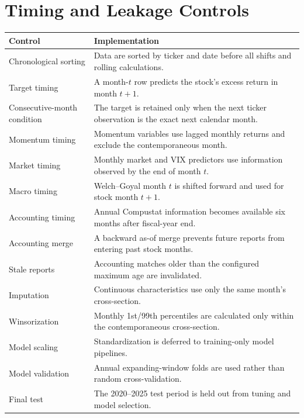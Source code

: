 \documentclass[11pt,a4paper]{article}
\begin{document}

\section{Timing and Leakage Controls}

\begin{center}
\small
\begin{tabularx}{\textwidth}{p{4.0cm}Y}
\toprule
Control & Implementation \\
\midrule

Chronological sorting
&
Data are sorted by ticker and date before all shifts and rolling calculations.
\\

Target timing
&
A month-\(t\) row predicts the stock's excess return in month \(t+1\).
\\

Consecutive-month condition
&
The target is retained only when the next ticker observation is the exact next
calendar month.
\\

Momentum timing
&
Momentum variables use lagged monthly returns and exclude the contemporaneous
month.
\\

Market timing
&
Monthly market and VIX predictors use information observed by the end of month
\(t\).
\\

Macro timing
&
Welch--Goyal month \(t\) is shifted forward and used for stock month \(t+1\).
\\

Accounting timing
&
Annual Compustat information becomes available six months after fiscal-year
end.
\\

Accounting merge
&
A backward as-of merge prevents future reports from entering past stock months.
\\

Stale reports
&
Accounting matches older than the configured maximum age are invalidated.
\\

Imputation
&
Continuous characteristics use only the same month's cross-section.
\\

Winsorization
&
Monthly 1st/99th percentiles are calculated only within the contemporaneous
cross-section.
\\

Model scaling
&
Standardization is deferred to training-only model pipelines.
\\

Model validation
&
Annual expanding-window folds are used rather than random cross-validation.
\\

Final test
&
The 2020--2025 test period is held out from tuning and model selection.
\\

\bottomrule
\end{tabularx}
\end{center}
\end{document}
